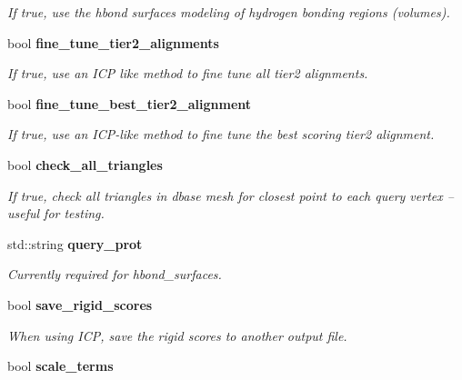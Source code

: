 \begin{CompactItemize}
\begin{CompactList}\small\item\em If true, use the hbond surfaces modeling of hydrogen bonding regions (volumes). \item\end{CompactList}\item 
bool \bf{fine\_\-tune\_\-tier2\_\-alignments}\label{classSimSite3D_1_1SearchParameters_7e249d3358f464048cca7f574052e844}

\begin{CompactList}\small\item\em If true, use an ICP like method to fine tune all tier2 alignments. \item\end{CompactList}\item 
bool \bf{fine\_\-tune\_\-best\_\-tier2\_\-alignment}\label{classSimSite3D_1_1SearchParameters_6c449d3293b369f0c71e875e14d2039a}

\begin{CompactList}\small\item\em If true, use an ICP-like method to fine tune the best scoring tier2 alignment. \item\end{CompactList}\item 
bool \bf{check\_\-all\_\-triangles}\label{classSimSite3D_1_1SearchParameters_44592b748c47ab06a54c680635dc0795}

\begin{CompactList}\small\item\em If true, check all triangles in dbase mesh for closest point to each query vertex -- useful for testing. \item\end{CompactList}\item 
std::string \bf{query\_\-prot}\label{classSimSite3D_1_1SearchParameters_600f1a2e9136a1c54dc751c3bc6f3665}

\begin{CompactList}\small\item\em Currently required for hbond\_\-surfaces. \item\end{CompactList}\item 
bool \bf{save\_\-rigid\_\-scores}\label{classSimSite3D_1_1SearchParameters_bc80a6f5d0264c5f4b5ca582c1183a14}

\begin{CompactList}\small\item\em When using ICP, save the rigid scores to another output file. \item\end{CompactList}\item 
bool \bf{scale\_\-terms}\label{classSimSite3D_1_1SearchParameters_dcb623f26a6aabaf855021f954cee078}


\end{CompactItemize}
